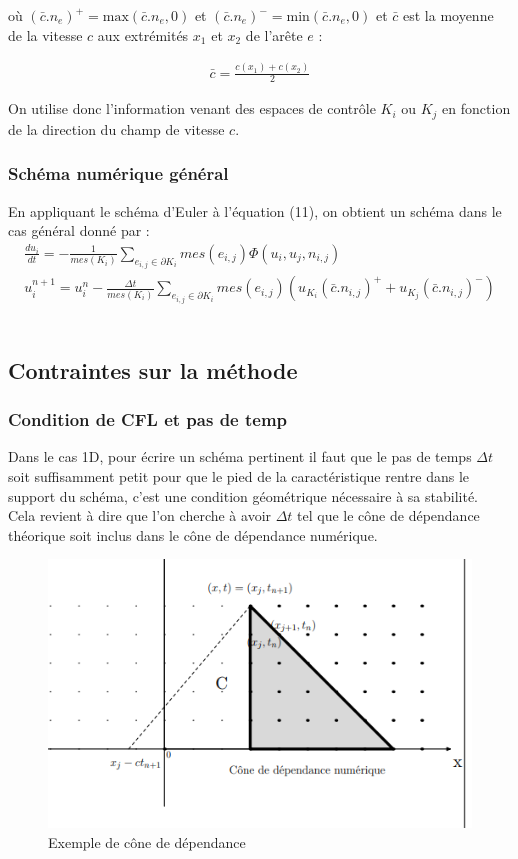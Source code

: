 \documentclass[12pt]{article}
\begin{document}
\noindent où $(\bar c.n_e)^+=\text{max}(\bar c.n_e,0)$ et $(\bar c.n_e)^-=\text{min}(\bar c.n_e,0)$ et $\bar c$ est la moyenne de la vitesse $c$ aux extrémités $x_1$ et $x_2$ de l'arête $e$ :

\begin{eqnarray}
       \bar c=\frac{c(x_1)+c(x_2)}{2}
\end{eqnarray}

\noindent On utilise donc l'information venant des espaces de contrôle $K_i$ ou $K_j$ en fonction de la direction du champ de vitesse $c$.

\subsubsection{Schéma numérique général}
\noindent En appliquant le schéma d'Euler à l'équation (11), on obtient un schéma dans le cas général donné par :
\begin{eqnarray}
       \frac{du_i}{dt}=-\frac{1}{mes(K_i)} \displaystyle\sum_{e_{i,j} \in \partial K_i} mes(e_{i,j})\Phi(u_i,u_j,n_{i,j})
       \\u_i^{n+1}=u_i^n-\frac{\Delta t}{mes(K_i)} \displaystyle\sum_{e_{i,j}\in \partial K_i} mes(e_{i,j}) (u_{K_i}(\bar c.n_{i,j})^+ + u_{K_j}(\bar c.n_{i,j})^-)
\end{eqnarray}
 \\
 \subsection{Contraintes sur la méthode}
 \subsubsection{Condition de CFL et pas de temp}
\noindent Dans le cas 1D, pour écrire un schéma pertinent il faut que le pas de temps $\Delta t$ soit suffisamment petit pour que le pied de la caractéristique rentre dans le support du schéma, c'est une condition géométrique nécessaire à sa stabilité.
 \\Cela revient à dire que l'on cherche à avoir $\Delta t$ tel que le cône de dépendance théorique soit inclus dans le cône de dépendance numérique.
 
 \begin{figure}[H]
	\centering
	\includegraphics[scale=0.7]{cone.png}
	\caption{Exemple de cône de dépendance}
	\label{1D}
	\end{figure}
	
\end{document}
